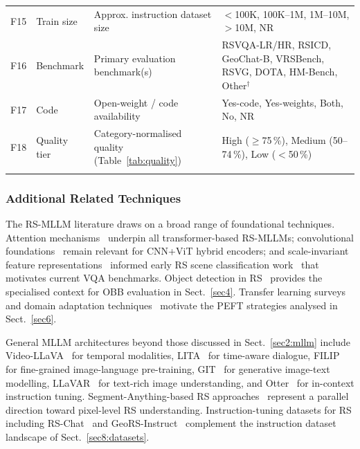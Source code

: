 \begin{table}[h]
\begin{tabular*}{\textwidth}{@{\extracolsep\fill}p{0.55cm}p{1.8cm}p{4.8cm}p{5.2cm}}
F15 & Train size   & Approx. instruction dataset size & $<$100K, 100K--1M, 1M--10M, $>$10M, NR \\
F16 & Benchmark    & Primary evaluation benchmark(s) & RSVQA-LR/HR, RSICD, GeoChat-B, VRSBench, RSVG, DOTA, HM-Bench, Other$^\dagger$ \\
F17 & Code         & Open-weight / code availability & Yes-code, Yes-weights, Both, No, NR \\
F18 & Quality tier & Category-normalised quality (Table~\ref{tab:quality}) & High ($\geq$75\,\%), Medium (50--74\,\%), Low ($<$50\,\%) \\
\botrule
\end{tabular*}
\end{table}

\subsubsection*{Additional Related Techniques}\label{sec2:addl}

The RS-MLLM literature draws on a broad range of foundational techniques.
Attention mechanisms~\cite{guo2022attention,vaswani2017attention} underpin all
transformer-based RS-MLLMs; convolutional foundations~\cite{maggiori2017convolutional,
he2016resnet,lu2021earth} remain relevant for CNN+ViT hybrid encoders; and
scale-invariant feature representations~\cite{lowe2004sift,yang2010bag} informed
early RS scene classification work~\cite{roberts2023satin} that motivates current VQA benchmarks.
Object detection in RS~\cite{li2020object,li2023multimodal,cheng2021survey,zhang2023obb}
provides the specialised context for OBB evaluation in Sect.~\ref{sec4}.
Transfer learning surveys~\cite{zhuang2021comprehensive} and domain adaptation
techniques~\cite{zhu2017unpaired} motivate the PEFT strategies
analysed in Sect.~\ref{sec6}.

General MLLM architectures beyond those discussed in Sect.~\ref{sec2:mllm} include
Video-LLaVA~\cite{videoLLaVA2023} for temporal modalities, LITA~\cite{lita2023}
for time-aware dialogue, FILIP~\cite{yao2022filip} for fine-grained
image-language pre-training, GIT~\cite{wang2023git} for generative image-text
modelling, LLaVAR~\cite{zhang2023llavar} for text-rich image understanding, and
Otter~\cite{li2023otter} for in-context instruction tuning. Segment-Anything-based RS
approaches~\cite{sam2023,geosam2024,samrseg2024} represent a parallel direction
toward pixel-level RS understanding. Instruction-tuning datasets for RS including
RS-Chat~\cite{rschat2025} and GeoRS-Instruct~\cite{geors2023} complement the
instruction dataset landscape of Sect.~\ref{sec8:datasets}.

